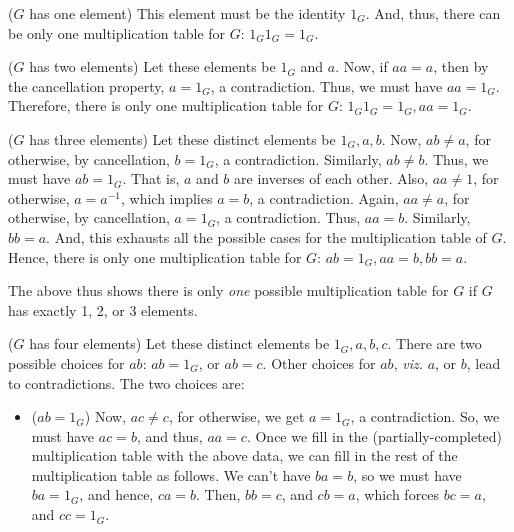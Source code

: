 \begin{xca}
($G$ has one element) This element must be the identity $1_G$. And, thus,
there can be only one multiplication table for $G$: $1_G 1_G = 1_G$.

($G$ has two elements) Let these elements be $1_G$ and $a$. Now, if $a a = a$,
then by the cancellation property, $a = 1_G$, a contradiction. Thus, we must
have $a a = 1_G$. Therefore, there is only one multiplication table for $G$:
$1_G 1_G = 1_G, a a = 1_G$.

($G$ has three elements) Let these distinct elements be $1_G, a, b$. Now, $a b
\neq a$, for otherwise, by cancellation, $b = 1_G$, a contradiction. Similarly,
$ab \neq b$. Thus, we must have $a b = 1_G$. That is, $a$ and $b$ are inverses
of each other. Also, $a a \neq 1$, for otherwise, $a = a^{-1}$, which implies
$a = b$, a contradiction. Again, $a a \neq a$, for otherwise, by cancellation,
$a = 1_G$, a contradiction. Thus, $a a = b$. Similarly, $b b = a$. And, this
exhausts all the possible cases for the multiplication table of $G$. Hence,
there is only one multiplication table for $G$: $a b = 1_G, a a = b, b b = a$.

The above thus shows there is only \emph{one} possible multiplication table for
$G$ if $G$ has exactly 1, 2, or 3 elements.

($G$ has four elements) Let these distinct elements be $1_G, a, b, c$. There
are two possible choices for $ab$: $ab = 1_G$, or $ab = c$. Other choices for
$ab$, \emph{viz.} $a$, or $b$, lead to contradictions. The two choices are:
\begin{itemize}
    \item ($ab = 1_G$) Now, $ac \neq c$, for otherwise, we get $a = 1_G$, a
    contradiction. So, we must have $ac = b$, and thus, $aa = c$. Once we fill
    in the (partially-completed) multiplication table with the above data, we
    can fill in the rest of the multiplication table as follows. We can't have
    $ba = b$, so we must have $ba = 1_G$, and hence, $ca = b$. Then, $bb = c$,
    and $cb = a$, which forces $bc = a$, and $cc = 1_G$.


\end{itemize}
\end{xca}

